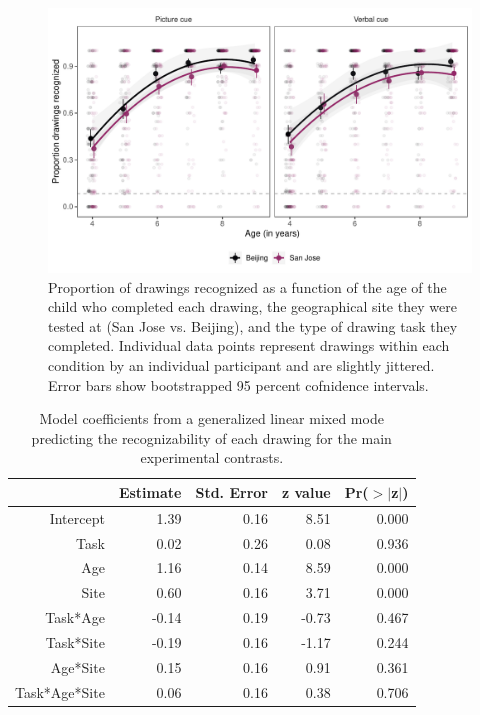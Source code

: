 \documentclass[
  man]{apa6}
\begin{document}
\begin{figure}[H]

{\centering \includegraphics[width=\textwidth]{figs/main-results-1} 

}

\caption{Proportion of drawings recognized as a function of the age of the child who completed each drawing, the geographical site they were tested at (San Jose vs. Beijing), and the type of drawing task they completed. Individual data points represent drawings within each condition by an individual participant and are slightly jittered. Error bars show bootstrapped 95 percent cofnidence intervals.}\label{fig:main-results}
\end{figure}

\begin{table}[ht]
\centering
\begin{tabular}{rrrrr}
  \hline
 & Estimate & Std. Error & z value & Pr($>$$|$z$|$) \\ 
  \hline
Intercept & 1.39 & 0.16 & 8.51 & 0.000 \\ 
  Task & 0.02 & 0.26 & 0.08 & 0.936 \\ 
  Age & 1.16 & 0.14 & 8.59 & 0.000 \\ 
  Site & 0.60 & 0.16 & 3.71 & 0.000 \\ 
  Task*Age & -0.14 & 0.19 & -0.73 & 0.467 \\ 
  Task*Site & -0.19 & 0.16 & -1.17 & 0.244 \\ 
  Age*Site & 0.15 & 0.16 & 0.91 & 0.361 \\ 
  Task*Age*Site & 0.06 & 0.16 & 0.38 & 0.706 \\ 
   \hline
\end{tabular}
\caption{Model coefficients from a generalized linear mixed mode predicting the recognizability of each drawing for the main experimental contrasts.} 
\end{table}
\end{document}
